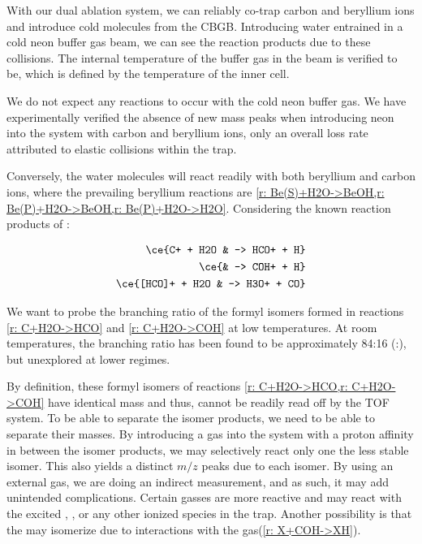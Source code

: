 With our dual ablation system, we can reliably co-trap carbon and beryllium ions and introduce cold molecules from the CBGB. Introducing water entrained in a cold neon buffer gas beam, we can see the reaction products due to these collisions. The internal temperature of the buffer gas in the beam is verified to be, which is defined by the temperature of the inner cell.

We do not expect any reactions to occur with the cold neon buffer gas. We have experimentally verified the absence of new mass peaks when introducing neon into the system with carbon and beryllium ions, only an overall loss rate attributed to elastic collisions within the trap. 

Conversely, the water molecules will react readily with both beryllium and carbon ions, where the prevailing beryllium reactions are \cref{r: Be(S)+H2O->BeOH,r: Be(P)+H2O->BeOH,r: Be(P)+H2O->H2O}. Considering the known reaction products of :

\begin{align}
	\ce{C+ + H2O & -> HCO+ + H} \label{r: C+H2O->HCO} \\
	\ce{& -> COH+ + H} \label{r: C+H2O->COH} \\
	\ce{[HCO]+ + H2O & -> H3O+ + CO} \label{r: [HCO]+H2O->H3O}
\end{align}

We want to probe the branching ratio of the formyl isomers formed in reactions \ref{r: C+H2O->HCO} and \ref{r: C+H2O->COH} at low temperatures. At room temperatures, the branching ratio has been found to be approximately 84:16 (:)\cite{Freeman1987}, but unexplored at lower regimes.

By definition, these formyl isomers of reactions \cref{r: C+H2O->HCO,r: C+H2O->COH} have identical mass and thus, cannot be readily read off by the TOF system. To be able to separate the isomer products, we need to be able to separate their masses. By introducing a gas into the system with a proton affinity in between the isomer products, we may selectively react only one the less stable  isomer. This also yields a distinct $m/z$ peaks due to each isomer. By using an external gas, we are doing an indirect measurement, and as such, it may add unintended complications. Certain gasses are more reactive and may react with the excited , , or any other ionized species in the trap. Another possibility is that the  may isomerize due to interactions with the gas(\ref{r: X+COH->XH}).\cite{Love1987}

